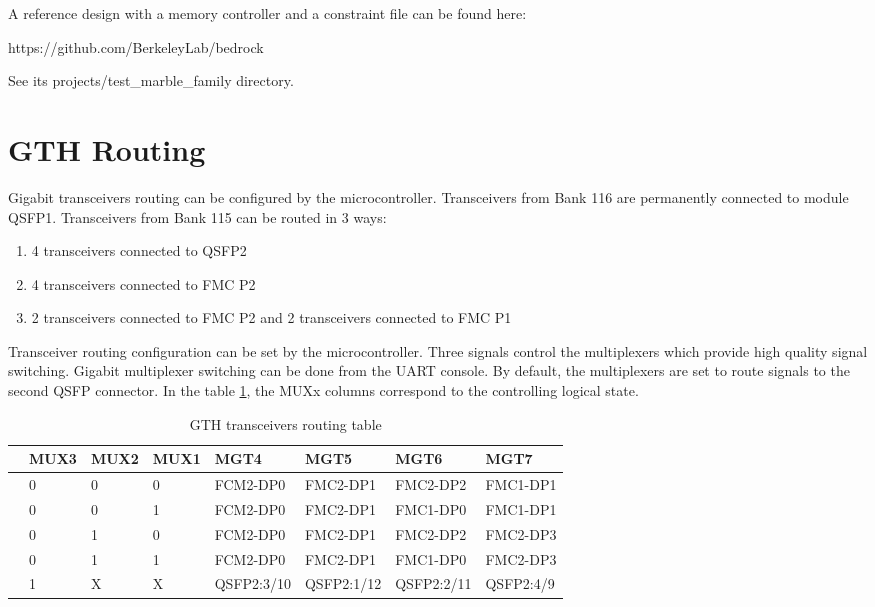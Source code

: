 \documentclass[12pt,oneside,a4]{article}
\begin{document}
A reference design with a memory controller and a constraint file can be found here:
\begin{leftbar}
https://github.com/BerkeleyLab/bedrock
\end{leftbar}
See its projects/test\_marble\_family directory.

\section{GTH Routing}
Gigabit transceivers routing can be configured by the microcontroller. Transceivers from Bank 116 are permanently connected to module QSFP1. Transceivers from Bank 115 can be routed in 3 ways:
\begin{enumerate}
    \item 4 transceivers connected to QSFP2
    \item 4 transceivers connected to FMC P2
    \item 2 transceivers connected to FMC P2 and 2 transceivers connected to FMC P1
\end{enumerate}

Transceiver routing configuration can be set by the microcontroller. Three signals control the multiplexers which provide high quality signal switching. Gigabit multiplexer switching can be done from the UART console. By default, the multiplexers are set to route signals to the second QSFP connector. In the table \ref{table}, the MUXx columns correspond to the controlling logical state.

\begin{table}[htbp]
\begin{tabular}{@{}llllllll@{}}
\toprule
 & MUX3 & MUX2 & MUX1 & MGT4       & MGT5       & MGT6       & MGT7      \\ \midrule
 & 0    & 0    & 0    & FCM2-DP0   & FMC2-DP1   & FMC2-DP2   & FMC1-DP1  \\
 & 0    & 0    & 1    & FCM2-DP0   & FMC2-DP1   & FMC1-DP0   & FMC1-DP1  \\
 & 0    & 1    & 0    & FCM2-DP0   & FMC2-DP1   & FMC2-DP2   & FMC2-DP3  \\
 & 0    & 1    & 1    & FCM2-DP0   & FMC2-DP1   & FMC1-DP0   & FMC2-DP3  \\
 & 1    & X    & X    & QSFP2:3/10 & QSFP2:1/12 & QSFP2:2/11 & QSFP2:4/9 \\ \bottomrule
\end{tabular}
\caption{GTH transceivers routing table}\label{table}
\end{table}
\end{document}
